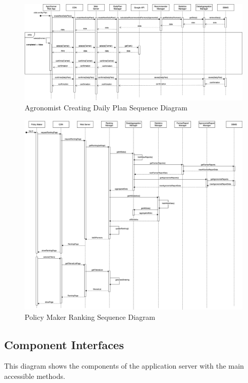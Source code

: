 \begin{figure}[hbt!]
\centering
\includegraphics[width=\textwidth]{../images_diagrams/dd/agronomist_sequencediagram.png}
\caption{Agronomist Creating Daily Plan Sequence Diagram}
\label{fig:agronomistDailyPlanSequenceDiagram}
\end{figure}


\begin{figure}[hbt!]
\centering
\includegraphics[width=\textwidth]{../images_diagrams/dd/policyMakerSequenceDiaEXT.drawio.png}
\caption{Policy Maker Ranking Sequence Diagram}
\label{fig:policyMakerRankingSequenceDiagram}
\end{figure}

\newpage
\subsection{Component Interfaces}
\noindent
This diagram shows the components of the application server with the main accessible methods.\\

